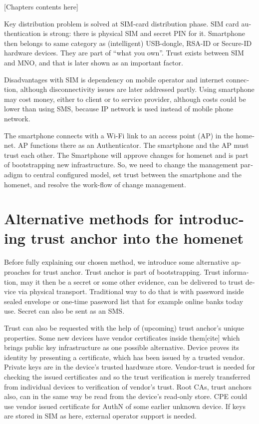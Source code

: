 \documentclass[12pt,a4paper,english]{tutthesis}
\begin{document}
\begin{otherlanguage}{english}
[Chapters contents here]

Key distribution problem is solved at SIM-card distribution phase.
SIM card authentication is strong: there is physical SIM and secret PIN for it.
Smartphone then belongs to same category as (intelligent) USB-dongle,
RSA-ID or Secure-ID hardware devices.  They are part of ``what you own''.
Trust exists between SIM and MNO, and that is later shown as an
important factor. 



Disadvantages with SIM is dependency on mobile operator and internet
connection, although disconnectivity issues are later addressed partly.
Using smartphone may cost money, either to client or to service
provider, although costs could be lower than using SMS, because 
IP network is used instead of mobile
phone network.

The smartphone connects
 with a Wi-Fi link to an access point (AP) in the homenet.
 AP functions there as an Authenticator.
The smartphone and the AP must trust each other.
The Smartphone will approve changes for homenet and is part of bootstrapping
new infrastructure. 
So, we need to change the management paradigm to central configured
model, set trust between the smartphone and the homenet, and 
resolve the work-flow of change management.

\section{Alternative methods for introducing trust anchor into the homenet}
\label{sec-4-1}

Before fully explaining our chosen method, we introduce some
alternative approaches for trust anchor. Trust anchor is part of
bootstrapping. Trust information, may it then be a secret or some
other evidence, can be delivered to trust device via physical
transport. Traditional way to do that is with password inside sealed
envelope or one-time password list that for example online banks today
use. Secret can also be sent as an SMS.

Trust can also be requested with the help of (upcoming) trust anchor's unique
 properties. Some new devices have vendor certificates inside them[cite] which
brings public key infrastructure as one possible alternative. 
Device proves its identity by presenting a certificate, which has been issued by a trusted
vendor.  Private keys are in the device's trusted hardware store.
Vendor-trust is needed for checking the issued certificates and so the
trust verification is merely transferred from individual devices
 to verification of vendor's trust.
Root CAs, trust anchors also, can in the same way be read from the device's read-only store. 
CPE could use vendor issued certificate for AuthN of some earlier unknown device.
If keys are stored in SIM as here, external operator support is needed. 



\end{otherlanguage}
\end{document}

